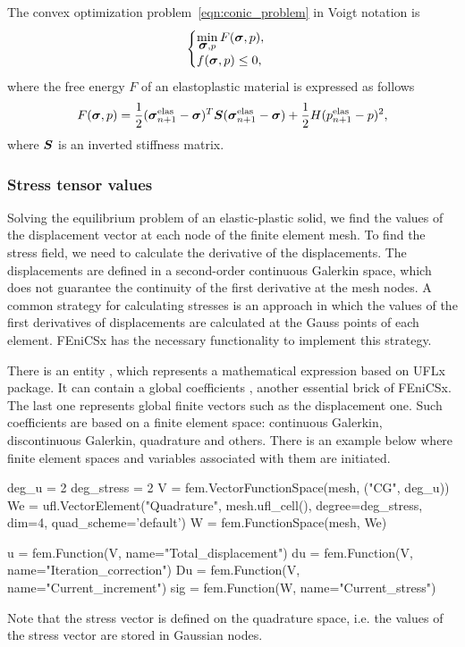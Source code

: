 \documentclass[12pt]{article}
\begin{document}
The convex optimization problem~\ref{eqn:conic_problem} in Voigt notation is
\begin{equation}
    \label{eqn:conic_problem_Voigt}
    \begin{cases}
        \min\limits_{\mbox{\boldmath$\sigma$}, p} F(\mbox{\boldmath$\sigma$}, p), \\
        f(\mbox{\boldmath$\sigma$}, p) \leq 0,
    \end{cases}
\end{equation}
where the free energy $F$ of an elastoplastic material is expressed as follows
\begin{equation}
    F(\mbox{\boldmath$\sigma$}, p) = \frac{1}{2}(\mbox{\boldmath$\sigma$}_{n+1}^\text{elas} - \mbox{\boldmath$\sigma$})^T \mbox{\boldmath $S$} (\mbox{\boldmath$\sigma$}_{n+1}^\text{elas} - \mbox{\boldmath$\sigma$}) + \frac{1}{2}H(p_{n+1}^\text{elas} - p)^2,
\end{equation}
where $\mbox{\boldmath $S$}$ is an inverted stiffness matrix.

\subsubsection{Stress tensor values}

Solving the equilibrium problem of an elastic-plastic solid, we find the values of the displacement vector at each node of the finite element mesh. To find the stress field, we need to calculate the derivative of the displacements. The displacements are defined in a second-order continuous Galerkin space, which does not guarantee the continuity of the first derivative at the mesh nodes. A common strategy for calculating stresses is an approach in which the values of the first derivatives of displacements are calculated at the Gauss points of each element. FEniCSx has the necessary functionality to implement this strategy. 

There is an entity , which represents a mathematical expression based on UFLx package. It can contain a global coefficients , another essential brick of FEniCSx. The last one represents global finite vectors such as the displacement one. Such coefficients are based on a finite element space: continuous Galerkin, discontinuous Galerkin, quadrature and others. There is an example below where finite element spaces and variables associated with them are initiated.

\begin{pythoncode}
    deg_u = 2
    deg_stress = 2
    V = fem.VectorFunctionSpace(mesh, ("CG", deg_u))
    We = ufl.VectorElement("Quadrature", mesh.ufl_cell(), degree=deg_stress, dim=4, quad_scheme='default')
    W = fem.FunctionSpace(mesh, We)

    u = fem.Function(V, name="Total_displacement")
    du = fem.Function(V, name="Iteration_correction")
    Du = fem.Function(V, name="Current_increment")
    sig = fem.Function(W, name="Current_stress")
\end{pythoncode}
Note that the stress vector  is defined on the quadrature space, i.e. the values of the stress vector are stored in Gaussian nodes. 
\end{document}
